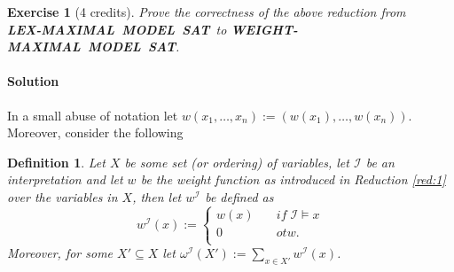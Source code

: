 \documentclass [11pt]{article}
\newcommand{\MAXWEIGHTSAT}{\mbox{\bf WEIGHT-MAXIMAL MODEL SAT}}
\newcommand{\MAXLEXSAT}{\mbox{\bf LEX-MAXIMAL MODEL SAT}}
\newtheorem{definition}[theorem]{Definition}
\newtheorem{exercise}[theorem]{Exercise}
\begin{document}
\medskip
\newpage


\begin{exercise}[4 credits]
{\em 
Prove the correctness of the above reduction
from \\
\MAXLEXSAT\ to 
\MAXWEIGHTSAT.
}%
\end{exercise}


\paragraph*{Solution}


In a small abuse of notation let $w(x_1, \dots , x_n):=(w(x_1),\dots,w(x_n))$. Moreover, consider the following

\begin{definition}
Let $X$ be some set (or ordering) of variables, let $\mathcal{I}$ be an interpretation and let $w$ be the weight function as introduced in Reduction \ref{red:1} over the variables in $X$, then let $w^{\mathcal{I}}$ be defined as
\begin{equation*}
w^{\mathcal{I}}(x):= \begin{cases}
w(x) \quad & \mathit{if}  \; \mathcal{I} \models x  \\
0 \quad & \mathit{otw.}   \\
\end{cases}
\end{equation*}
Moreover, for some $X' \subseteq X$ let $\omega^{\mathcal{I}}(X'):=\sum_{x \in X'} w^{\mathcal{I}}(x)$.
\end{definition}
\end{document}
